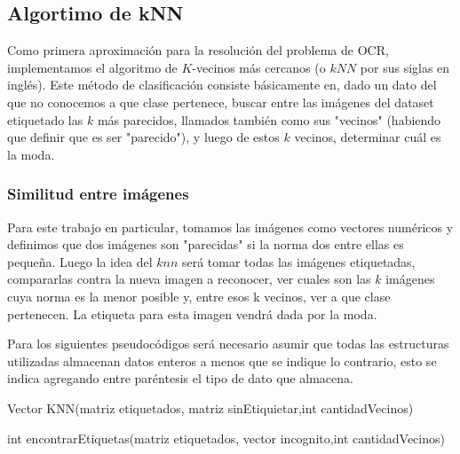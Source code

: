 \subsection{Algortimo de kNN}
Como primera aproximación para la resolución del problema de OCR, implementamos el algoritmo de $K$-vecinos más cercanos (o $kNN$ por sus siglas en inglés). Este método de clasificación consiste básicamente en, dado un dato del que no conocemos a que clase pertenece, buscar entre las imágenes del dataset etiquetado las $k$ más parecidos, llamados también como sus "vecinos" (habiendo que definir que es ser "parecido"), y luego de estos $k$ vecinos, determinar cuál es la moda. 
\\
\subsubsection{Similitud entre imágenes}
Para este trabajo en particular, tomamos las imágenes como vectores numéricos y definimos que dos imágenes son "parecidas" si la norma dos entre ellas es pequeña. Luego la idea del $knn$ será tomar todas las imágenes etiquetadas, compararlas contra la nueva imagen a reconocer, ver cuales son las $k$ imágenes cuya norma es la menor posible y, entre esos k vecinos, ver a que clase pertenecen. La etiqueta para esta imagen vendrá dada por la moda. 

Para los siguientes pseudocódigos será necesario asumir que todas las estructuras utilizadas almacenan datos enteros a menos que se indique lo contrario, esto se indica agregando entre paréntesis el tipo de dato que almacena.
\\
\begin{algorithm}
\begin{algorithmic}[1]\parskip=1mm
\caption{Vector KNN(matriz etiquetados, matriz sinEtiquietar,int cantidadVecinos)}
\ENDFOR
{}
\end{algorithmic}
\end{algorithm}

\begin{algorithm}
\begin{algorithmic}[1]\parskip=1mm
\caption{int encontrarEtiquetas(matriz etiquetados, vector incognito,int cantidadVecinos)}
\ENDFOR
{}
\ENDWHILE\\
\end{algorithmic}
\end{algorithm}

